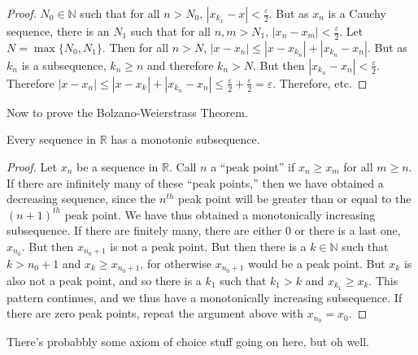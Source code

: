 \documentclass[crop=false,class=article,oneside]{standalone}
\begin{document}
\begin{proof}
                $N_{0}\in\mathbb{N}$ such that for all
                $n>N_{0}$, $|x_{k_{x}}-x|<\frac{\varepsilon}{2}$.
                But as $x_{n}$ is a Cauchy sequence, there is an
                $N_{1}$ such that for all $n,m>N_{1}$, 
                $|x_{n}-x_{m}|<\frac{\varepsilon}{2}$. Let
                $N=\max\{N_{0},N_{1}\}$. Then for all $n>N$,
                $|x-x_{n}|\leq|x-x_{k_{n}}|+|x_{k_{n}}-x_{n}|$.
                But as $k_{n}$ is a subsequence,
                $k_{n}\geq{n}$ and therefore $k_{n}>N$.
                But then $|x_{k_{n}}-x_{n}|<\frac{\varepsilon}{2}$.
                Therefore
                $|x-x_{n}|\leq|x-x_{k_{}}|+|x_{k_{n}}-x_{n}|\leq%
                 \frac{\varepsilon}{2}+\frac{\varepsilon}{2}%
                 =\varepsilon$. Therefore, etc.
            \end{proof}
            Now to prove the Bolzano-Weierstrass Theorem.
            \begin{theorem}
                Every sequence in $\mathbb{R}$ has a monotonic
                subsequence.
            \end{theorem}
            \begin{proof}
                Let $x_{n}$ be a sequence in $\mathbb{R}$. Call
                $n$ a ``peak point'' if $x_{n}\geq{x_{m}}$ for all
                ${m}\geq{n}$. If there are infinitely many of
                these ``peak points,'' then we have obtained
                a decreasing sequence, since the $n^{th}$ peak point
                will be greater than or equal to
                the $(n+1)^{th}$ peak point. We have thus obtained
                a monotonically increasing  subsequence.
                If there are finitely many,
                there are either $0$ or there is a last one,
                $x_{n_{0}}$. But then $x_{n_{0}+1}$ is not a
                peak point. But then there is a $k\in\mathbb{N}$
                such that $k>n_{0}+1$ and $x_{k}\geq{x_{n_{0}+1}}$, for
                otherwise $x_{n_{0}+1}$ would be a peak point.
                But $x_{k}$ is also not a peak point, and so there is
                a $k_{1}$ such that $k_{1}>k$ and
                $x_{k_{1}}\geq{x_{k}}$. This pattern continues, and
                we thus have a monotonically increasing subsequence.
                If there are zero peak points,
                repeat the argument above with $x_{n_{0}}=x_{0}$.
            \end{proof}
            There's probabbly some axiom of choice stuff going on
            here, but oh well.
\end{document}
